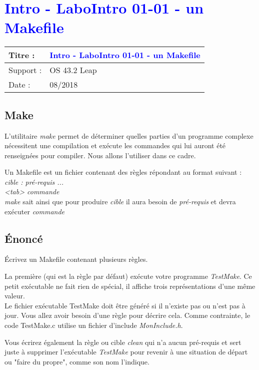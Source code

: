 \lstset{language=c}
\renewcommand{\titre}{\textcolor{blue}{ Intro - LaboIntro 01-01 - un Makefile }}

\lhead{ \titre }
\section{{\titre} }

\begin{tabular}{|l|l|}
\hline
Titre : 	& \titre \\\hline
Support : 	& OS 43.2 Leap\\\hline
Date :		& 08/2018 \\\hline
\end{tabular}

\subsection{Make}
L'utilitaire \emph{make} permet de déterminer quelles parties d'un programme complexe nécessitent une compilation et exécute les commandes qui lui auront été renseignées pour compiler. Nous allons l'utiliser dans ce cadre.

Un Makefile est un fichier contenant des règles répondant au format suivant :\\

%
\emph{cible : pré-requis ...}\\
\emph{<tab> commande }\\


\emph{make} sait ainsi que pour produire \emph{cible} il aura besoin de \emph{pré-requis} et devra exécuter \emph{commande}

\subsection{Énoncé}

Écrivez un Makefile contenant plusieurs règles.

La première (qui est la règle par défaut) exécute votre programme \emph{TestMake}. Ce petit exécutable ne fait rien de spécial, il affiche trois représentations d'une même  valeur. \\ Le fichier exécutable TestMake doit être généré si il n'existe pas ou n'est pas à jour. Vous allez avoir besoin d'une règle pour décrire cela. Comme contrainte, le code TestMake.c utilise un fichier d'include \emph{MonInclude.h}.

Vous écrirez également la règle ou cible \emph{clean} qui n'a aucun pré-requis et sert juste à supprimer l'exécutable \emph{TestMake} pour revenir à une situation de départ ou "faire du propre", comme son nom l'indique.

